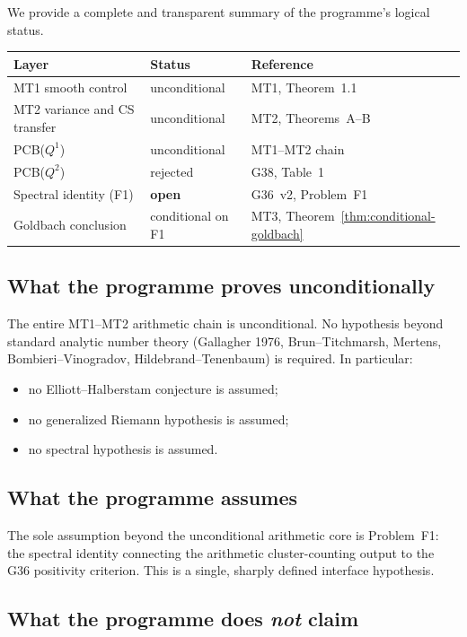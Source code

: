 \documentclass[11pt,a4paper]{article}
\begin{document}
We provide a complete and transparent summary of the programme's logical status.

\begin{center}
\begin{tabular}{@{}lll@{}}
\toprule
\textbf{Layer} & \textbf{Status} & \textbf{Reference} \\
\midrule
MT1 smooth control & unconditional & MT1, Theorem~1.1 \\
MT2 variance and CS transfer & unconditional & MT2, Theorems~A--B \\
PCB($Q^1$) & unconditional & MT1--MT2 chain \\
PCB($Q^2$) & rejected & G38, Table~1 \\
Spectral identity (F1) & \textbf{open} & G36~v2, Problem~F1 \\
Goldbach conclusion & conditional on F1 & MT3, Theorem~\ref{thm:conditional-goldbach} \\
\bottomrule
\end{tabular}
\end{center}

\subsection{What the programme proves unconditionally}

The entire MT1--MT2 arithmetic chain is unconditional. No hypothesis beyond standard analytic number theory (Gallagher 1976, Brun--Titchmarsh, Mertens, Bombieri--Vinogradov, Hildebrand--Tenenbaum) is required. In particular:
\begin{itemize}
    \item no Elliott--Halberstam conjecture is assumed;
    \item no generalized Riemann hypothesis is assumed;
    \item no spectral hypothesis is assumed.
\end{itemize}

\subsection{What the programme assumes}

The sole assumption beyond the unconditional arithmetic core is Problem~F1: the spectral identity connecting the arithmetic cluster-counting output to the G36 positivity criterion. This is a single, sharply defined interface hypothesis.

\subsection{What the programme does \emph{not} claim}
\end{document}
